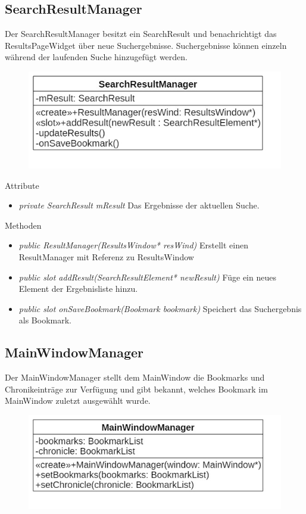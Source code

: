 \subsection*{SearchResultManager}
Der SearchResultManager besitzt ein SearchResult und benachrichtigt das ResultsPageWidget über neue Suchergebnisse. Suchergebnisse können einzeln während der laufenden Suche hinzugefügt werden.

\begin{figure}[H]
\centering
\includegraphics[scale=0.5]{img/Klassendiagramm/Klassen/Controller/SearchResultManager}
\label{fig:searchResultManager}
\end{figure}

Attribute
\begin{itemize}
	\item\textit{private SearchResult mResult}
	Das Ergebnisse der aktuellen Suche.
\end{itemize}

Methoden
\begin{itemize}
	\item\textit{public ResultManager(ResultsWindow* resWind)}
	Erstellt einen ResultManager mit Referenz zu ResultsWindow
	\item\textit{public slot addResult(SearchResultElement* newResult)}
	Füge ein neues Element der Ergebnisliste hinzu.
	\item\textit{public slot onSaveBookmark(Bookmark bookmark)}
 	Speichert das Suchergebnis als Bookmark.
\end{itemize}

\subsection*{MainWindowManager}
Der MainWindowManager stellt dem MainWindow die Bookmarks und Chronikeinträge zur Verfügung und gibt bekannt, welches Bookmark im MainWindow zuletzt ausgewählt wurde.

\begin{figure}[H]
\centering
\includegraphics[scale=0.5]{img/Klassendiagramm/Klassen/Controller/MainWindowManager}
\label{fig:mainWindowManager}
\end{figure}

